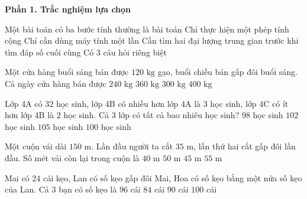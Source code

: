 \textbf{Phần 1. Trắc nghiệm lựa chọn}

\begin{ex} %
Một bài toán có ba bước tính thường là bài toán
\choice
{Chỉ thực hiện một phép tính cộng}
{Chỉ cần dùng máy tính một lần}
{\True Cần tìm hai đại lượng trung gian trước khi tìm đáp số cuối cùng}
{Có 3 câu hỏi riêng biệt}
\end{ex}

\begin{ex} %
Một cửa hàng buổi sáng bán được $120\text{ kg}$ gạo, buổi chiều bán gấp đôi buổi sáng. Cả ngày cửa hàng bán được
\choice
{$240\text{ kg}$}
{\True $360\text{ kg}$}
{$300\text{ kg}$}
{$400\text{ kg}$}
\end{ex}

\begin{ex} %
Lớp 4A có $32$ học sinh, lớp 4B có nhiều hơn lớp 4A là $3$ học sinh, lớp 4C có ít hơn lớp 4B là $2$ học sinh. Cả 3 lớp có tất cả bao nhiêu học sinh?
\choice
{$98$ học sinh}
{$102$ học sinh}
{$105$ học sinh}
{\True $100$ học sinh}
\end{ex}

\begin{ex} %
Một cuộn vải dài $150\text{ m}$. Lần đầu người ta cắt $35\text{ m}$, lần thứ hai cắt gấp đôi lần đầu. Số mét vải còn lại trong cuộn là
\choice
{$40\text{ m}$}
{$50\text{ m}$}
{\True $45\text{ m}$}
{$55\text{ m}$}
\end{ex}

\begin{ex} %
Mai có $24$ cái kẹo, Lan có số kẹo gấp đôi Mai, Hoa có số kẹo bằng một nửa số kẹo của Lan. Cả 3 bạn có số kẹo là
\choice
{\True $96$ cái}
{$84$ cái}
{$90$ cái}
{$100$ cái}
\end{ex}

